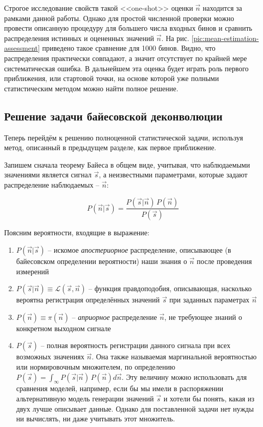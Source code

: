 \documentclass[12pt]{book}
\begin{document}
	Строгое исследование свойств такой <<one-shot>> оценки $\vec{n}$ находится за рамками данной работы. Однако для простой численной проверки можно провести описанную процедуру для большего числа входных бинов и сравнить распределения истинных и оцененных значений $\vec{n}$. На рис. \ref{pic:mean-estimation-assessment} приведено такое сравнение для 1000 бинов. Видно, что распределения практически совпадают, а значит отсутствует по крайней мере систематическая ошибка. В дальнейшем эта оценка будет играть роль первого приближения, или стартовой точки, на основе которой уже полными статистическим методом можно найти полное решение.
	
	\subsection{Решение задачи байесовской деконволюции}
	\label{sec:bayesian-deconvolution-solution}
	
	Теперь перейдём к решению полноценной статистической задачи, используя метод, описанный в предыдущем разделе, как первое приближение.
	
	Запишем сначала теорему Байеса в общем виде, учитывая, что наблюдаемыми значениями является сигнал $\vec{s}$, а неизвестными параметрами, которые задают распределение наблюдаемых -- $\vec{n}$:
	
	\begin{equation}
		P(\vec{n} | \vec{s}) = \frac{P(\vec{s} | \vec{n}) \, P(\vec{n})}{P(\vec{s})}
	\end{equation}

	Поясним вероятности, входящие в выражение: 
	
	\begin{enumerate}
		\item $P(\vec{n} | \vec{s})$ -- искомое \textit{апостериорное} распределение, описывающее (в байесовском определении вероятности) наши знания о $\vec{n}$ после проведения измерений
		\item $P(\vec{s} | \vec{n}) \equiv \mathcal{L}(\vec{s}, \vec{n})$ -- функция правдоподобия, описывающая, насколько вероятна регистрация определённых значений $\vec{s}$ при заданных параметрах $\vec{n}$
		\item $P(\vec{n}) \equiv \pi(\vec{n})$ -- \textit{априорное} распределение $\vec{n}$, не требующее знаний о конкретном выходном сигнале
		\item $P(\vec{s})$ -- полная вероятность регистрации данного сигнала при всех возможных значениях $\vec{n}$. Она также называемая маргинальной вероятностью или нормировочным множителем, по определению $P(\vec{s}) = \int_{\infty} P(\vec{s} | \vec{n}) \, P(\vec{n}) d\vec{n}$. Эту величину можно использовать для сравнения моделей, например, если бы мы имели в распоряжении альтернативную модель генерации значений $\vec{s}$ и хотели бы понять, какая из двух лучше описывает данные. Однако для поставленной задачи нет нужды ни вычислять, ни даже учитывать этот множитель.
	\end{enumerate}
\end{document}
